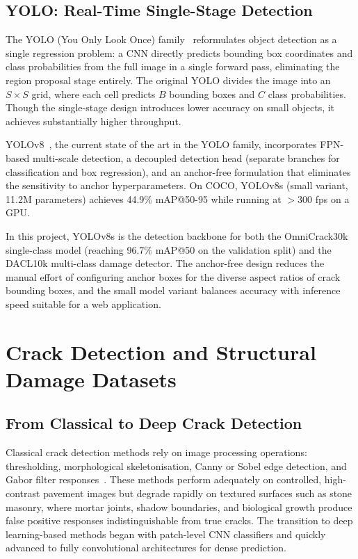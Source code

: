 \documentclass[12pt,a4paper]{article}
\begin{document}
\subsection{YOLO: Real-Time Single-Stage Detection}

The YOLO (You Only Look Once) family~\cite{redmon2016yolo} reformulates object detection as a single regression problem: a CNN directly predicts bounding box coordinates and class probabilities from the full image in a single forward pass, eliminating the region proposal stage entirely. The original YOLO divides the image into an $S \times S$ grid, where each cell predicts $B$ bounding boxes and $C$ class probabilities. Though the single-stage design introduces lower accuracy on small objects, it achieves substantially higher throughput.

YOLOv8~\cite{jocher2023yolov8}, the current state of the art in the YOLO family, incorporates FPN-based multi-scale detection, a decoupled detection head (separate branches for classification and box regression), and an anchor-free formulation that eliminates the sensitivity to anchor hyperparameters. On COCO, YOLOv8s (small variant, 11.2M parameters) achieves 44.9\% mAP@50-95 while running at $>$300 fps on a GPU.

In this project, YOLOv8s is the detection backbone for both the OmniCrack30k single-class model (reaching 96.7\% mAP@50 on the validation split) and the DACL10k multi-class damage detector. The anchor-free design reduces the manual effort of configuring anchor boxes for the diverse aspect ratios of crack bounding boxes, and the small model variant balances accuracy with inference speed suitable for a web application.

\section{Crack Detection and Structural Damage Datasets}
\label{sec:crack}

\subsection{From Classical to Deep Crack Detection}

Classical crack detection methods rely on image processing operations: thresholding, morphological skeletonisation, Canny or Sobel edge detection, and Gabor filter responses~\cite{zou2012cracktree}. These methods perform adequately on controlled, high-contrast pavement images but degrade rapidly on textured surfaces such as stone masonry, where mortar joints, shadow boundaries, and biological growth produce false positive responses indistinguishable from true cracks. The transition to deep learning-based methods began with patch-level CNN classifiers and quickly advanced to fully convolutional architectures for dense prediction.
\end{document}
